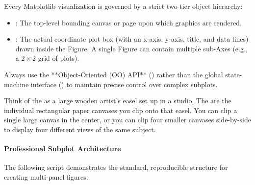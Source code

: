 \begin{keyidea}
Every Matplotlib visualization is governed by a strict two-tier object hierarchy:
\begin{itemize}
    \item \textbf{}: The top-level bounding canvas or page upon which graphics are rendered.
    \item \textbf{}: The actual coordinate plot box (with an x-axis, y-axis, title, and data lines) drawn inside the Figure. A single Figure can contain multiple sub-Axes (e.g., a $2 \times 2$ grid of plots).
\end{itemize}
Always use the **Object-Oriented (OO) API** () rather than the global state-machine interface () to maintain precise control over complex subplots.
\end{keyidea}

\begin{analogy}
Think of the  as a large wooden artist's easel set up in a studio. The  are the individual rectangular paper canvases you clip onto that easel. You can clip a single large canvas in the center, or you can clip four smaller canvases side-by-side to display four different views of the same subject.
\end{analogy}

\paragraph{Professional Subplot Architecture}
The following script demonstrates the standard, reproducible structure for creating multi-panel figures:

